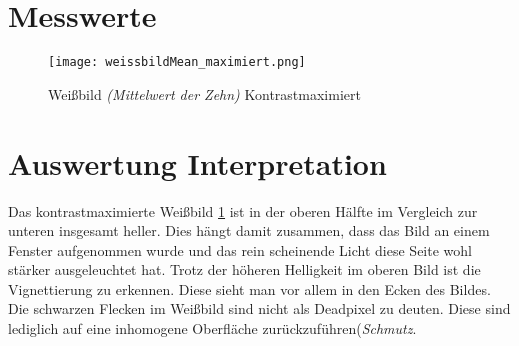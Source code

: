 \section{Messwerte}
\label{chap:VERSUCH_3_MESSWERTE}
\begin{figure}[H]
\centering
\texttt{[image: weissbildMean\_maximiert.png]}
\caption{Weißbild \textit{(Mittelwert der Zehn)} Kontrastmaximiert}
\label{img:WeissBild_KontrastMax}
\end{figure}
\section{Auswertung Interpretation}
\label{chap:VERSUCH_3_AUSWERTUNG}
Das kontrastmaximierte Weißbild \ref{img:WeissBild_KontrastMax} ist in der oberen Hälfte im Vergleich zur unteren insgesamt heller. Dies hängt damit zusammen, dass das Bild an einem Fenster aufgenommen wurde und das rein scheinende Licht diese Seite wohl stärker ausgeleuchtet hat. Trotz der höheren Helligkeit im oberen Bild ist die Vignettierung zu erkennen. Diese sieht man vor allem in den Ecken des Bildes. Die schwarzen Flecken im Weißbild sind nicht als Deadpixel zu deuten. Diese sind lediglich auf eine inhomogene Oberfläche zurückzuführen(\textit{Schmutz}.